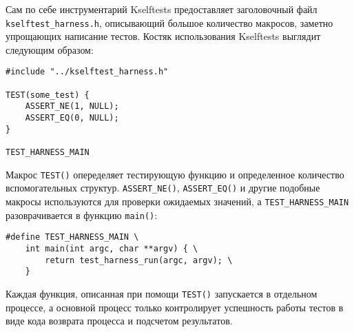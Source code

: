 Сам по себе инструментарий Kselftests предоставляет заголовочный файл
\texttt{kselftest\_harness.h}, описывающий большое количество макросов, заметно
упрощающих написание тестов. Костяк использования Kselftests выглядит следующим
образом:
\medskip
\begin{lstlisting}[style=cstyle]
#include "../kselftest_harness.h"

TEST(some_test) {
	ASSERT_NE(1, NULL);
	ASSERT_EQ(0, NULL);
}

TEST_HARNESS_MAIN
\end{lstlisting}
\medskip

Макрос \texttt{TEST()} опеределяет тестирующую функцию и определенное количество
вспомогательных структур. \texttt{ASSERT\_NE()}, \texttt{ASSERT\_EQ()} и другие
подобные макросы используются для проверки ожидаемых значений, а
\texttt{TEST\_HARNESS\_MAIN} разоврачивается в функцию \texttt{main()}:
\medskip
\begin{lstlisting}[style=cstyle]
#define TEST_HARNESS_MAIN \
	int main(int argc, char **argv) { \
		return test_harness_run(argc, argv); \
	}
\end{lstlisting}
\medskip

Каждая функция, описанная при помощи \texttt{TEST()} запускается в отдельном
процессе, а основной процесс только контролирует успешность работы тестов в виде
кода возврата процесса и подсчетом результатов.
